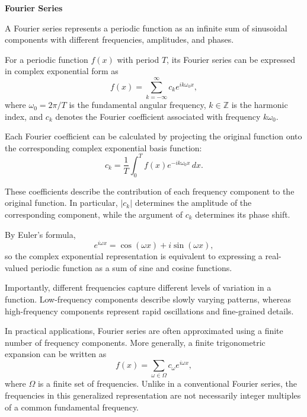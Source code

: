 \documentclass[12pt]{article}
\numberwithin{equation}{section}  %
\begin{document}
\textbf{Fourier Series}

A Fourier series represents a periodic function as an infinite sum of sinusoidal components with different frequencies, amplitudes, and phases.

For a periodic function $f(x)$ with period $T$, its Fourier series can be expressed in complex exponential form as
\begin{equation}
    f(x)=\sum_{k=-\infty}^{\infty}
    c_k e^{ik\omega_0 x},
    \label{eq:fourier_series}
\end{equation}
where $\omega_0=2\pi/T$ is the fundamental angular frequency, $k\in\mathbb{Z}$ is the harmonic index, and $c_k$ denotes the Fourier coefficient associated with frequency $k\omega_0$.

Each Fourier coefficient can be calculated by projecting the original function onto the corresponding complex exponential basis function:
\begin{equation}
    c_k=\frac{1}{T}\int_0^T
    f(x)e^{-ik\omega_0 x}\,dx.
    \label{eq:fourier_coefficients}
\end{equation}

These coefficients describe the contribution of each frequency component to the original function. In particular, $|c_k|$ determines the amplitude of the corresponding component, while the argument of $c_k$ determines its phase shift.

By Euler's formula,
\begin{equation}
    e^{i\omega x}
    =\cos(\omega x)+i\sin(\omega x),
\end{equation}
so the complex exponential representation is equivalent to expressing a real-valued periodic function as a sum of sine and cosine functions.

Importantly, different frequencies capture different levels of variation in a function. Low-frequency components describe slowly varying patterns, whereas high-frequency components represent rapid oscillations and fine-grained details.

In practical applications, Fourier series are often approximated using a finite number of frequency components. More generally, a finite trigonometric expansion can be written as
\begin{equation}
    f(x)=\sum_{\omega\in\Omega}
    c_{\omega}e^{i\omega x},
    \label{eq:finite_fourier_series}
\end{equation}
where $\Omega$ is a finite set of frequencies. Unlike in a conventional Fourier series, the frequencies in this generalized representation are not necessarily integer multiples of a common fundamental frequency.
\end{document}
